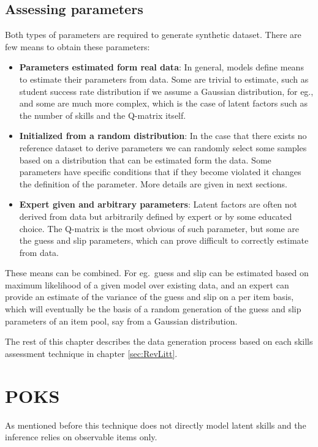 \subsection{Assessing parameters}

Both types of parameters are required to generate synthetic dataset. There are few means to obtain these parameters:
\begin{itemize}
\item \textbf{Parameters estimated form real data}: In general, models define means to estimate their parameters from data. Some are trivial to estimate, such as student success rate distribution if we assume a Gaussian distribution, for eg., and some are much more complex, which is the case of latent factors such as the number of skills and the Q-matrix itself.
\item \textbf{Initialized from a random distribution}: In the case that there exists no reference dataset to derive parameters we can randomly select some samples based on a distribution that can be estimated form the data. Some parameters have specific conditions that if they become violated it changes the definition of the parameter. More details are given in next sections.
\item \textbf{Expert given and arbitrary parameters}: Latent factors are often not derived from data but arbitrarily defined by expert or by some educated choice. The Q-matrix is the most obvious of such parameter, but some are the guess and slip parameters, which can prove difficult to correctly estimate from data.

\end{itemize}

These means can be combined. For eg.\ guess and slip can be estimated based on maximum likelihood of a given model over existing data, and an expert can provide an estimate of the variance of the guess and slip on a per item basis, which will eventually be the basis of a random generation of the guess and slip parameters of an item pool, say from a Gaussian distribution.

The rest of this chapter describes the data generation process based on each skills assessment technique in chapter \ref{sec:RevLitt}.

\section{POKS}

As mentioned before this technique does not directly model latent skills and the inference relies on observable items only. 

